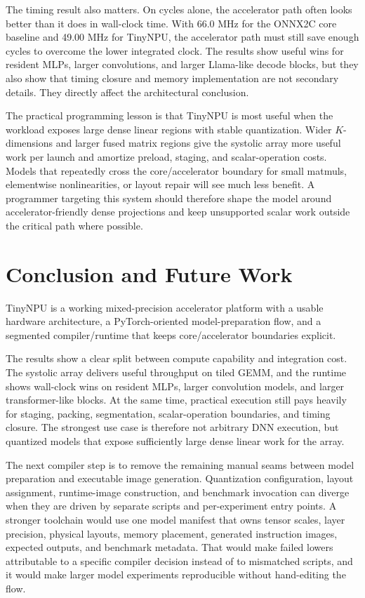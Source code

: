 \documentclass[a4paper, 12pt, titlepage]{article}
\begin{document}
The timing result also matters. On cycles alone, the accelerator path often looks better than it does in wall-clock time. With 66.0 MHz for the ONNX2C core baseline and 49.00 MHz for TinyNPU, the accelerator path must still save enough cycles to overcome the lower integrated clock. The results show useful wins for resident MLPs, larger convolutions, and larger Llama-like decode blocks, but they also show that timing closure and memory implementation are not secondary details. They directly affect the architectural conclusion.

The practical programming lesson is that TinyNPU is most useful when the workload exposes large dense linear regions with stable quantization. Wider \(K\)-dimensions and larger fused matrix regions give the systolic array more useful work per launch and amortize preload, staging, and scalar-operation costs. Models that repeatedly cross the core/accelerator boundary for small matmuls, elementwise nonlinearities, or layout repair will see much less benefit. A programmer targeting this system should therefore shape the model around accelerator-friendly dense projections and keep unsupported scalar work outside the critical path where possible.

\newpage
\section{Conclusion and Future Work}
TinyNPU is a working mixed-precision accelerator platform with a usable hardware architecture, a PyTorch-oriented model-preparation flow, and a segmented compiler/runtime that keeps core/accelerator boundaries explicit.

The results show a clear split between compute capability and integration cost. The systolic array delivers useful throughput on tiled GEMM, and the runtime shows wall-clock wins on resident MLPs, larger convolution models, and larger transformer-like blocks. At the same time, practical execution still pays heavily for staging, packing, segmentation, scalar-operation boundaries, and timing closure. The strongest use case is therefore not arbitrary DNN execution, but quantized models that expose sufficiently large dense linear work for the array.

The next compiler step is to remove the remaining manual seams between model preparation and executable image generation. Quantization configuration, layout assignment, runtime-image construction, and benchmark invocation can diverge when they are driven by separate scripts and per-experiment entry points. A stronger toolchain would use one model manifest that owns tensor scales, layer precision, physical layouts, memory placement, generated instruction images, expected outputs, and benchmark metadata. That would make failed lowers attributable to a specific compiler decision instead of to mismatched scripts, and it would make larger model experiments reproducible without hand-editing the flow.
\end{document}
